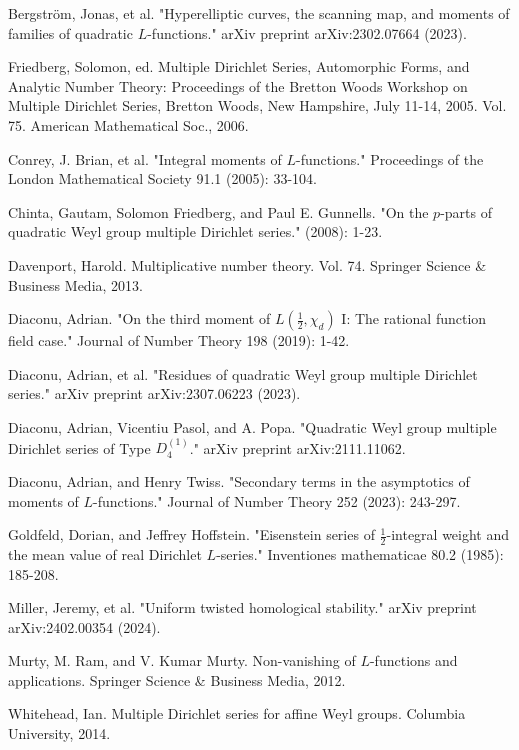 \documentclass[12pt,reqno,oneside]{amsart}
\begin{document}
\begin{thebibliography}{}
  Bergström, Jonas, et al. "Hyperelliptic curves, the scanning map, and moments of families of quadratic $L$-functions." arXiv preprint arXiv:2302.07664 (2023).

  Friedberg, Solomon, ed. Multiple Dirichlet Series, Automorphic Forms, and Analytic Number Theory: Proceedings of the Bretton Woods Workshop on Multiple Dirichlet Series, Bretton Woods, New Hampshire, July 11-14, 2005. Vol. 75. American Mathematical Soc., 2006.

  Conrey, J. Brian, et al. "Integral moments of $L$-functions." Proceedings of the London Mathematical Society 91.1 (2005): 33-104.

  Chinta, Gautam, Solomon Friedberg, and Paul E. Gunnells. "On the $p$-parts of quadratic Weyl group multiple Dirichlet series." (2008): 1-23.

  Davenport, Harold. Multiplicative number theory. Vol. 74. Springer Science \& Business Media, 2013.

  Diaconu, Adrian. "On the third moment of $L(\frac{1}{2},\chi_{d})$ I: The rational function field case." Journal of Number Theory 198 (2019): 1-42.

  Diaconu, Adrian, et al. "Residues of quadratic Weyl group multiple Dirichlet series." arXiv preprint arXiv:2307.06223 (2023).

  Diaconu, Adrian, Vicentiu Pasol, and A. Popa. "Quadratic Weyl group multiple Dirichlet series of Type $D_{4}^{(1)}$." arXiv preprint arXiv:2111.11062.

  Diaconu, Adrian, and Henry Twiss. "Secondary terms in the asymptotics of moments of $L$-functions." Journal of Number Theory 252 (2023): 243-297.

  Goldfeld, Dorian, and Jeffrey Hoffstein. "Eisenstein series of $\frac{1}{2}$-integral weight and the mean value of real Dirichlet $L$-series." Inventiones mathematicae 80.2 (1985): 185-208.

  Miller, Jeremy, et al. "Uniform twisted homological stability." arXiv preprint arXiv:2402.00354 (2024).

  Murty, M. Ram, and V. Kumar Murty. Non-vanishing of $L$-functions and applications. Springer Science \& Business Media, 2012.

  Whitehead, Ian. Multiple Dirichlet series for affine Weyl groups. Columbia University, 2014.
\end{thebibliography}
\end{document}
